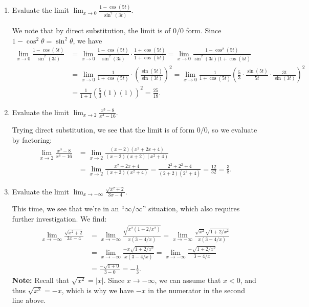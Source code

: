 \documentclass[12pt]{article}
\newcommand{\di}{\displaystyle}
\newcommand{\abs}[1]{\lvert #1\rvert}
\begin{document}
\begin{enumerate}
 \item  Evaluate the limit $\di \lim_{x\to 0}\frac{1-\cos(5t)}{\sin^2(3t)}$.
 
 We note that by direct substitution, the limit is of $0/0$ form. Since $1-\cos^2\theta=\sin^2\theta$, we have
 \begin{align*}
 \lim_{x\to 0}\frac{1-\cos(5t)}{\sin^2(3t)} & = \lim_{x\to 0}\frac{1-\cos(5t)}{\sin^2(3t)}\cdot\frac{1+\cos(5t)}{1+\cos(5t)} = \lim_{x\to 0}\frac{1-\cos^2(5t)}{\sin^2(3t)(1+\cos(5t)}\\
 & = \lim_{x\to 0}\frac{1}{1+\cos(5t)}\cdot \left(\frac{\sin(5t)}{\sin(3t)}\right)^2 = \lim_{x\to 0}\frac{1}{1+\cos(5t)}\left(\frac{5}{3}\cdot \frac{\sin(5t)}{5t}\cdot \frac{3t}{\sin(3t)}\right)^2\\
 & = \frac{1}{1+1}\left(\frac{5}{3}(1)(1)\right)^2 = \frac{25}{18}.
 \end{align*}
 
 \medskip
 
 \item Evaluate the limit $\di \lim_{x\to 2}\frac{x^3-8}{x^4-16}$.
 
 Trying direct substitution, we see that the limit is of form $0/0$, so we evaluate by factoring:
 \begin{align*}
 \lim_{x\to 2}\frac{x^3-8}{x^4-16} & = \lim_{x\to 2}\frac{(x-2)(x^2+2x+4)}{(x-2)(x+2)(x^2+4)}\\
 & = \lim_{x\to 2}\frac{x^2+2x+4}{(x+2)(x^2+4)} = \frac{2^2+2^2+4}{(2+2)(2^2+4)} = \frac{12}{32} = \frac{3}{8}.
 \end{align*}
 
 \medskip
 
 \item Evaluate the limit $\di \lim_{x\to -\infty}\frac{\sqrt{x^2+2}}{3x-4}$.
 
 This time, we see that we're in an ``$\infty/\infty$'' situation, which also requires further investigation. We find:
 \begin{align*}
 \lim_{x\to -\infty}\frac{\sqrt{x^2+2}}{3x-4}& = \lim_{x\to -\infty}\frac{\sqrt{x^2(1+2/x^2)}}{x(3-4/x)} = \lim_{x\to -\infty}\frac{\sqrt{x^2}\sqrt{1+2/x^2}}{x(3-4/x)}\\
 & = \lim_{x\to -\infty}\frac{-x\sqrt{1+2/x^2}}{x(3-4/x)}= \lim_{x\to -\infty}\frac{-\sqrt{1+2/x^2}}{3-4/x}\\
 & = \frac{-\sqrt{1+0}}{3-0} = -\frac{1}{3}.
 \end{align*}
 \textbf{Note:} Recall that $\sqrt{x^2} = \abs{x}$. Since $x\to -\infty$, we can assume that $x<0$, and thus $\sqrt{x^2}=-x$, which is why we have $-x$ in the numerator in the second line above.
\end{enumerate}
\end{document}
